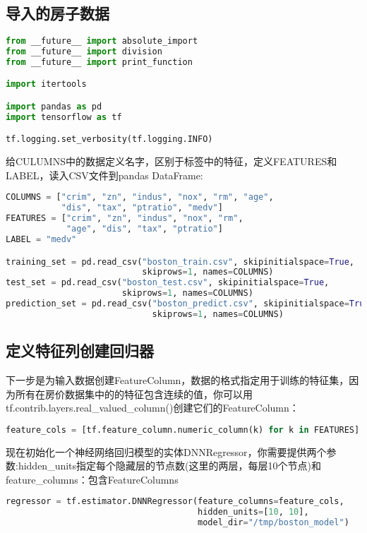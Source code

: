 \subsection{导入的房子数据}
\begin{lstlisting}[language=Python]
from __future__ import absolute_import
from __future__ import division
from __future__ import print_function

import itertools

import pandas as pd
import tensorflow as tf

tf.logging.set_verbosity(tf.logging.INFO)
\end{lstlisting}
给CULUMNS中的数据定义名字，区别于标签中的特征，定义FEATURES和LABEL，读入CSV文件到pandas DataFrame:
\begin{lstlisting}[language=Python]
COLUMNS = ["crim", "zn", "indus", "nox", "rm", "age",
           "dis", "tax", "ptratio", "medv"]
FEATURES = ["crim", "zn", "indus", "nox", "rm",
            "age", "dis", "tax", "ptratio"]
LABEL = "medv"

training_set = pd.read_csv("boston_train.csv", skipinitialspace=True,
                           skiprows=1, names=COLUMNS)
test_set = pd.read_csv("boston_test.csv", skipinitialspace=True,
                       skiprows=1, names=COLUMNS)
prediction_set = pd.read_csv("boston_predict.csv", skipinitialspace=True,
                             skiprows=1, names=COLUMNS)
\end{lstlisting}
\subsection{定义特征列创建回归器}
下一步是为输入数据创建FeatureColumn，数据的格式指定用于训练的特征集，因为所有在房价数据集中的的特征包含连续的值，你可以用tf.contrib.layers.real\_valued\_column()创建它们的FeatureColumn：
\begin{lstlisting}[language=Python]
feature_cols = [tf.feature_column.numeric_column(k) for k in FEATURES]
\end{lstlisting}
现在初始化一个神经网络回归模型的实体DNNRegressor，你需要提供两个参数:hidden\_units指定每个隐藏层的节点数(这里的两层，每层10个节点)和feature\_columns：包含FeatureColumns
\begin{lstlisting}[language=Python]
regressor = tf.estimator.DNNRegressor(feature_columns=feature_cols,
                                      hidden_units=[10, 10],
                                      model_dir="/tmp/boston_model")
\end{lstlisting}
